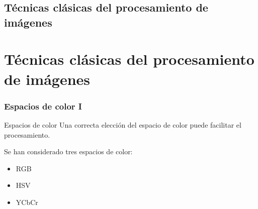 \documentclass[11pt]{beamer}
\begin{document}
        \subsection{Técnicas clásicas del procesamiento de imágenes}
        \section*{Técnicas clásicas del procesamiento de imágenes}

        \subsubsection{Espacios de color I}
        \begin{frame}{Espacios de color}
            Una correcta elección del espacio de color puede facilitar el procesamiento.

            Se han considerado tres espacios de color:
            \begin{itemize}
                \item RGB
                \item HSV
                \item YCbCr
            \end{itemize}
        \end{frame}
        
\end{document}
